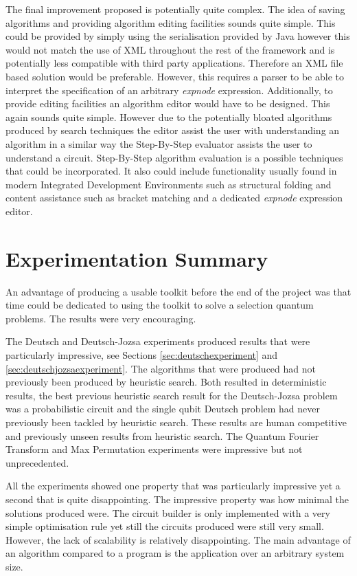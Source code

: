 The final improvement proposed is potentially quite complex.
The idea of saving algorithms and providing algorithm editing facilities sounds quite simple.
This could be provided by simply using the serialisation provided by Java however this would not match the use of XML throughout the rest of the framework and is potentially less compatible with third party applications.
Therefore an XML file based solution would be preferable.
However, this requires a parser to be able to interpret the specification of an arbitrary \emph{expnode} expression.
Additionally, to provide editing facilities an algorithm editor would have to be designed.
This again sounds quite simple.
However due to the potentially bloated algorithms produced by search techniques the editor assist the user with understanding an algorithm in a similar way the Step-By-Step evaluator assists the user to understand a circuit.
Step-By-Step algorithm evaluation is a possible techniques that could be incorporated.
It also could include functionality usually found in modern Integrated Development Environments such as structural folding and content assistance such as bracket matching and a dedicated \emph{expnode} expression editor.

\section{Experimentation Summary}

An advantage of producing a usable toolkit before the end of the project was that time could be dedicated to using the toolkit to solve a selection quantum problems.
The results were very encouraging.

The Deutsch and Deutsch-Jozsa experiments produced results that were particularly impressive, see Sections \ref{sec:deutschexperiment} and \ref{sec:deutschjozsaexperiment}.
The algorithms that were produced had not previously been produced by heuristic search.
Both resulted in deterministic results, the best previous heuristic search result for the Deutsch-Jozsa problem was a probabilistic circuit and the single qubit Deutsch problem had never previously been tackled by heuristic search.
These results are human competitive and previously unseen results from heuristic search.
The Quantum Fourier Transform and Max Permutation experiments were impressive but not unprecedented.

All the experiments showed one property that was particularly impressive yet a second that is quite disappointing.
The impressive property was how minimal the solutions produced were.
The circuit builder is only implemented with a very simple optimisation rule yet still the circuits produced were still very small.
However, the lack of scalability is relatively disappointing.
The main advantage of an algorithm compared to a program is the application over an arbitrary system size.

